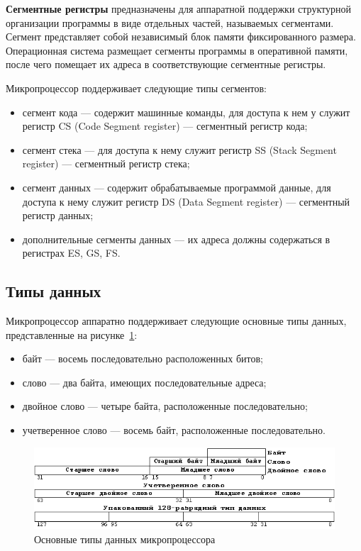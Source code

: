\textbf{Сегментные регистры} предназначены для аппаратной поддержки структурной
организации программы в виде отдельных частей, называемых сегментами.
Сегмент представляет собой независимый блок памяти фиксированного размера.
Операционная система размещает сегменты программы в оперативной памяти,
после чего помещает их адреса в соответствующие сегментные регистры.

Микропроцессор поддерживает следующие типы сегментов:

\begin{itemize}
  \item сегмент кода --- содержит машинные команды, для доступа к нем у служит регистр CS
    (Code Segment register) --- сегментный регистр кода;
  \item сегмент стека --- для доступа к нему служит регистр SS (Stack Segment register) ---
    сегментный регистр стека;
  \item сегмент данных --- содержит обрабатываемые программой данные, для доступа к нему
    служит регистр DS (Data Segment register) --- сегментный регистр данных;
  \item
    дополнительные сегменты данных --- их адреса должны содержаться в регистрах ES, GS, FS.
\end{itemize}


\subsection{Типы данных}

Микропроцессор аппаратно поддерживает следующие основные типы данных, представленные
на рисунке~\ref{fig:sizes}:

\begin{itemize}
  \item байт --- восемь последовательно расположенных битов;
  \item слово --- два байта, имеющих последовательные адреса;
  \item двойное слово --- четыре байта, расположенные последовательно;
  \item учетверенное слово --- восемь байт, расположенные последовательно.
\end{itemize}

\begin{figure}[htbp]
  \centering
  \includegraphics[width=150mm]{pic/sizes}
  \caption{Основные типы данных микропроцессора}\label{fig:sizes}
\end{figure}


